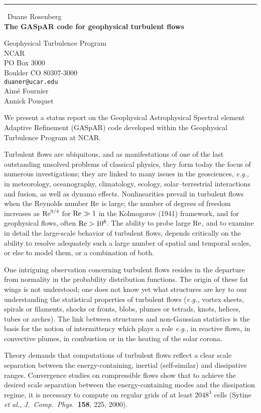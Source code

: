 \documentclass{report}
\begin{document}
\begin{center}
\rule{6in}{1pt} \
{\large Duane Rosenberg \\
{\bf The GASpAR code for geophysical turbulent flows}}

Geophysical Turbulence Program \\ NCAR \\ PO Box 3000 \\ Boulder CO 80307-3000
\\
{\tt duaner@ucar.edu}\\
Aim\'e Fournier\\
Annick Pouquet\end{center}

\newcommand\Rn{{\rm Re}}
We present a status report on the Geophysical Astrophysical Spectral element
Adaptive Refinement (GASpAR) code developed within the Geophysical
Turbulence Program at NCAR.

Turbulent flows are ubiquitous, and as manifestations of one of the
last outstanding unsolved problems of classical physics, they form
today the focus of numerous investigations; they
are linked to many issues in the geosciences, {\it e.g.,} in meteorology,
oceanography, climatology, ecology, solar--terrestrial interactions
and fusion, as well as dynamo effects.
Nonlinearities prevail in turbulent flows when the
Reynolds number $\Rn$
is large; the number of degrees of freedom increases as
$\Rn^{9/4}$ for $\Rn\gg1$ in the Kolmogorov (1941) framework,
and for geophysical flows, often $\Rn> 10^8$.
The ability to probe large $\Rn$, and to examine in detail the
large-scale behavior of turbulent flows, depends
critically on the ability to resolve adequately such a large number of
spatial and temporal scales, or else to model them, or a combination of both.

One intriguing observation concerning turbulent flows
resides in the
departure from normality in the probability distribution
functions.
The origin of these fat wings is not understood;
one does not know yet what structures are key to our
understanding the statistical properties of turbulent flows ({\it e.g.,}
vortex sheets, spirals or filaments,
shocks or fronts, blobs, plumes or tetrads, knots, helices, tubes or
arches).
The link between structures and non-Gaussian statistics is the basis
for the notion of intermittency which plays a role {\it e.g.,} in
reactive flows, in convective plumes, in combustion or in the heating of
the solar corona.

Theory demands that computations of turbulent flows
reflect a clear scale separation between the energy-containing,
inertial (self-similar) and dissipative ranges.
Convergence
studies on compressible flows show that to achieve the desired
scale separation between the
energy-containing modes and the dissipation regime, it is necessary to
compute on regular grids of at least $2048^3$ cells (Sytine {\it et
al.}, {\it J.\ Comp.\ Phys.\ }{\bf 158}, 225, 2000).
\end{document}
